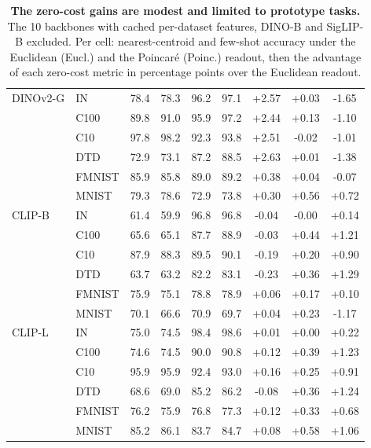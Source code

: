 \begin{table}[H]
\begin{tabular}{llccccccc}
\midrule
DINOv2-G & IN & 78.4 & 78.3 & 96.2 & 97.1 & +2.57 & +0.03 & -1.65 \\
 & C100 & 89.8 & 91.0 & 95.9 & 97.2 & +2.44 & +0.13 & -1.10 \\
 & C10 & 97.8 & 98.2 & 92.3 & 93.8 & +2.51 & -0.02 & -1.01 \\
 & DTD & 72.9 & 73.1 & 87.2 & 88.5 & +2.63 & +0.01 & -1.38 \\
 & FMNIST & 85.9 & 85.8 & 89.0 & 89.2 & +0.38 & +0.04 & -0.07 \\
 & MNIST & 79.3 & 78.6 & 72.9 & 73.8 & +0.30 & +0.56 & +0.72 \\
\midrule
CLIP-B & IN & 61.4 & 59.9 & 96.8 & 96.8 & -0.04 & -0.00 & +0.14 \\
 & C100 & 65.6 & 65.1 & 87.7 & 88.9 & -0.03 & +0.44 & +1.21 \\
 & C10 & 87.9 & 88.3 & 89.5 & 90.1 & -0.19 & +0.20 & +0.90 \\
 & DTD & 63.7 & 63.2 & 82.2 & 83.1 & -0.23 & +0.36 & +1.29 \\
 & FMNIST & 75.9 & 75.1 & 78.8 & 78.9 & +0.06 & +0.17 & +0.10 \\
 & MNIST & 70.1 & 66.6 & 70.9 & 69.7 & +0.04 & +0.23 & -1.17 \\
\midrule
CLIP-L & IN & 75.0 & 74.5 & 98.4 & 98.6 & +0.01 & +0.00 & +0.22 \\
 & C100 & 74.6 & 74.5 & 90.0 & 90.8 & +0.12 & +0.39 & +1.23 \\
 & C10 & 95.9 & 95.9 & 92.4 & 93.0 & +0.16 & +0.25 & +0.91 \\
 & DTD & 68.6 & 69.0 & 85.2 & 86.2 & -0.08 & +0.36 & +1.24 \\
 & FMNIST & 76.2 & 75.9 & 76.8 & 77.3 & +0.12 & +0.33 & +0.68 \\
 & MNIST & 85.2 & 86.1 & 83.7 & 84.7 & +0.08 & +0.58 & +1.06 \\
\bottomrule
\end{tabular}
\par\vspace{2pt}
\endgroup
\caption{\textbf{The zero-cost gains are modest and limited to prototype tasks.} The 10 backbones with cached per-dataset features, DINO-B and SigLIP-B excluded. Per cell: nearest-centroid and few-shot accuracy under the Euclidean (Eucl.) and the Poincar\'{e} (Poinc.) readout, then the advantage of each zero-cost metric in percentage points over the Euclidean readout.
}
\label{tab:q9-corollary}
\end{table}
